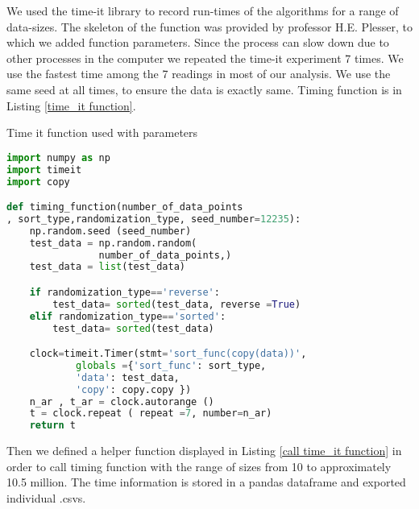 \documentclass[sigconf, nonacm, natbib, screen, balance=False]{acmart}
\begin{document}
We used the time-it library to record run-times of the algorithms for a range of data-sizes. The skeleton of the function was provided by professor H.E. Plesser, to which we added function parameters. Since the process can slow down due to other processes in the computer we repeated the time-it experiment 7 times. We use the fastest time among the 7 readings in most of our analysis. We use the same seed at all times, to ensure the data is exactly same. Timing function is in Listing \ref{time_it function}.

\begin{listing}
  \caption{Time it function used with parameters}
  \label{time_it function}
\begin{lstlisting}[language=Python]
import numpy as np
import timeit
import copy

def timing_function(number_of_data_points
, sort_type,randomization_type, seed_number=12235):
    np.random.seed (seed_number)
    test_data = np.random.random(
                number_of_data_points,)
    test_data = list(test_data)

    if randomization_type=='reverse':
        test_data= sorted(test_data, reverse =True)
    elif randomization_type=='sorted':
        test_data= sorted(test_data)

    clock=timeit.Timer(stmt='sort_func(copy(data))',
            globals ={'sort_func': sort_type,
            'data': test_data,
            'copy': copy.copy })
    n_ar , t_ar = clock.autorange ()
    t = clock.repeat ( repeat =7, number=n_ar)
    return t
\end{lstlisting}
\end{listing}

Then we defined a helper function displayed in Listing  \ref{call time_it function} in order to call timing function with the range of sizes from 10 to approximately 10.5 million. The time information is stored in a pandas dataframe and exported  individual .csvs.
\end{document}

